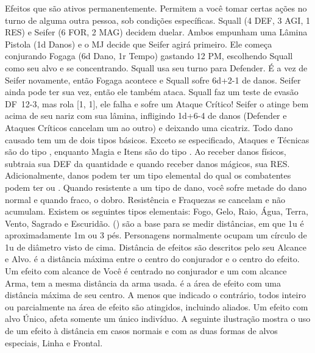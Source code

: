  Efeitos que são ativos permanentemente. \ofgap
{} Permitem a você tomar certas ações no turno de alguma outra pessoa, sob condições específicas.
%
\vfill
%
{
	Squall (4 DEF, 3 AGI, 1 RES) e Seifer (6 FOR, 2 MAG) decidem duelar. 
	Ambos empunham uma Lâmina Pistola (1d Danos) e o MJ decide que Seifer agirá primeiro. 
	Ele começa conjurando Fogaga (6d Dano, 1r Tempo) gastando 12 PM, escolhendo Squall como seu alvo e se concentrando. 
	Squall usa seu turno para Defender. 
	É a vez de Seifer novamente, então Fogaga acontece e Squall sofre \mbox{6d+2-1} de danos. 
	Seifer ainda pode ter sua vez, então ele também ataca. 
	Squall faz um teste de evasão \mbox{DF 12-3}, mas rola [1, 1], ele falha e sofre um Ataque Crítico! 
	Seifer o atinge bem acima de seu nariz com sua lâmina, infligindo \mbox{1d+6-4} de danos (Defender e Ataques Críticos cancelam um ao outro) e deixando uma cicatriz.
}
%
\clearpage
%
\newcommand{\elemicon}[1]{\hspace*{-0.14cm}#1\hspace*{-0.14cm}}
Todo dano causado tem um de dois tipos básicos. 
Exceto se especificado, Ataques e Técnicas são do tipo , enquanto Magia e Itens são do tipo . 
Ao receber danos físicos, subtraia sua DEF da quantidade e quando receber danos mágicos, sua RES. 
Adicionalmente, danos podem ter um tipo elemental do qual os combatentes podem ter  ou . 
Quando resistente a um tipo de dano, você sofre metade do dano normal e quando fraco, o dobro. 
Resistência e Fraquezas se cancelam e não acumulam. Existem os seguintes tipos elementais: Fogo, Gelo, Raio, Água, Terra, Vento, Sagrado e Escuridão.
%
\vfill
%
 () são a base para se medir distâncias, em que 1u é aproximadamente 1m ou 3 pés. 
Personagens normalmente ocupam um círculo de 1u de diâmetro visto de cima. 
Distância de efeitos são descritos pelo seu Alcance e Alvo. 
 é a distância máxima entre o centro do conjurador e o centro do efeito. 
Um efeito com alcance de Você é centrado no conjurador e um com alcance Arma, tem a mesma distância da arma usada. 
 é a área de efeito com uma distância máxima de seu centro. A menos que indicado o contrário, todos inteiro ou parcialmente na área de efeito são atingidos, incluindo aliados. 
Um efeito com alvo Único, afeta somente um único indivíduo. A seguinte ilustração mostra o uso de um efeito à distância em casos normais e com as duas formas de alvos especiais, Linha e Frontal.
